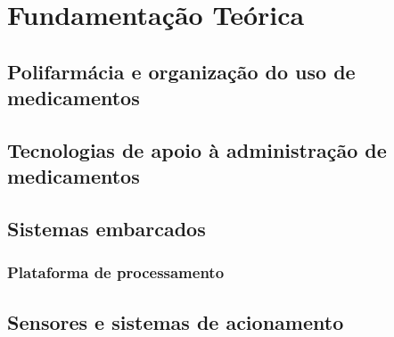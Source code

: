 
\chapter{Fundamentação Teórica}
\label{chap:fundamentacao}


\section{Polifarmácia e organização do uso de medicamentos}
\label{sec:polifarmacia}


\section{Tecnologias de apoio à administração de medicamentos}
\label{sec:tecnologias_medicamentos}


\section{Sistemas embarcados}
\label{sec:sistemas_embarcados}


\subsection{Plataforma de processamento}
\label{subsec:plataforma_processamento}


\section{Sensores e sistemas de acionamento}
\label{sec:sensores_acionamento}

